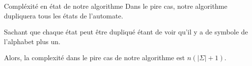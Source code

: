 \begin{frame}{\myframetitle}
  \begin{block}{Compléxité en état de notre algorithme}
    Dans le pire cas, notre algorithme dupliquera tous les états de
    l'automate. 

    \pause[]
    \vphantom{}

    Sachant que chaque état peut être dupliqué étant de voir qu'il y a de
    symbole de l'alphabet plus un. 

    \pause[]
    \vphantom{}

    Alors, la complexité dans le pire cas de notre algorithme est \(n(\lvert
    \Sigma \rvert + 1)\).
  \end{block}
\end{frame}
